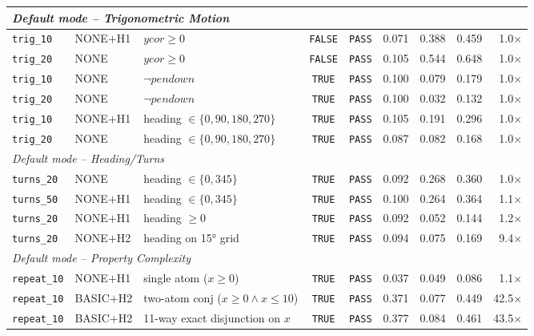 {\begin{longtable}{p{} p{} p{} c c r r r r}
\midrule
\multicolumn{9}{l}{\textit{Default mode -- Trigonometric Motion}} \\
\midrule
\texttt{trig\_10} & NONE$+$H1 & $\mathit{ycor} \geq 0$ & \texttt{FALSE} & \texttt{PASS} & 0.071 & 0.388 & 0.459 & 1.0$\times$ \\
\texttt{trig\_20} & NONE & $\mathit{ycor} \geq 0$ & \texttt{FALSE} & \texttt{PASS} & 0.105 & 0.544 & 0.648 & 1.0$\times$ \\
\texttt{trig\_10} & NONE & $\neg\mathit{pendown}$ & \texttt{TRUE} & \texttt{PASS} & 0.100 & 0.079 & 0.179 & 1.0$\times$ \\
\texttt{trig\_20} & NONE & $\neg\mathit{pendown}$ & \texttt{TRUE} & \texttt{PASS} & 0.100 & 0.032 & 0.132 & 1.0$\times$ \\
\texttt{trig\_10} & NONE$+$H1 & heading $\in \{0,90,180,270\}$ & \texttt{TRUE} & \texttt{PASS} & 0.105 & 0.191 & 0.296 & 1.0$\times$ \\
\texttt{trig\_20} & NONE & heading $\in \{0,90,180,270\}$ & \texttt{TRUE} & \texttt{PASS} & 0.087 & 0.082 & 0.168 & 1.0$\times$ \\
\midrule
\multicolumn{9}{l}{\textit{Default mode -- Heading/Turns}} \\
\midrule
\texttt{turns\_20} & NONE & heading $\in \{0,345\}$ & \texttt{TRUE} & \texttt{PASS} & 0.092 & 0.268 & 0.360 & 1.0$\times$ \\
\texttt{turns\_50} & NONE$+$H1 & heading $\in \{0,345\}$ & \texttt{TRUE} & \texttt{PASS} & 0.100 & 0.264 & 0.364 & 1.1$\times$ \\
\texttt{turns\_20} & NONE$+$H1 & heading $\geq 0$ & \texttt{TRUE} & \texttt{PASS} & 0.092 & 0.052 & 0.144 & 1.2$\times$ \\
\texttt{turns\_20} & NONE$+$H2 & heading on 15° grid & \texttt{TRUE} & \texttt{PASS} & 0.094 & 0.075 & 0.169 & 9.4$\times$ \\
\midrule
\multicolumn{9}{l}{\textit{Default mode -- Property Complexity}} \\
\midrule
\texttt{repeat\_10} & NONE$+$H1 & single atom ($x \geq 0$) & \texttt{TRUE} & \texttt{PASS} & 0.037 & 0.049 & 0.086 & 1.1$\times$ \\
\texttt{repeat\_10} & BASIC$+$H2 & two-atom conj ($x \geq 0 \land x \leq 10$) & \texttt{TRUE} & \texttt{PASS} & 0.371 & 0.077 & 0.449 & 42.5$\times$ \\
\texttt{repeat\_10} & BASIC$+$H2 & 11-way exact disjunction on $x$ & \texttt{TRUE} & \texttt{PASS} & 0.377 & 0.084 & 0.461 & 43.5$\times$ \\
\end{longtable}
}

